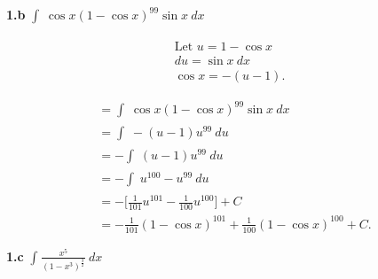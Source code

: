 \documentclass{report}
\begin{document}
    \pagebreak \bigbreak \noindent 
    \begin{mdframed}
        \textbf{1.b} $\int_{}^{}\ \cos{x}(1-\cos{x})^{99}\sin{x}\ dx $
    \end{mdframed}
    \bigbreak \noindent 
    \begin{minipage}[t]{0.47\textwidth}
    \begin{align*}
        \text{Let $u=1-\cos{x}$} \\
        du = \sin{x}\ dx \\
        \cos{x} = -(u-1)
    .\end{align*}
    \end{minipage}
    \begin{minipage}[t]{0.52\textwidth}
        \begin{align*}
            &=\int_{}^{}\ \cos{x}(1-\cos{x})^{99}\sin{x}\ dx \\
            &=\int_{}^{}\ -(u-1)u^{99}\ du \\
            &=-\int_{}^{}\ (u-1)u^{99}\ du \\
            &=-\int_{}^{}\ u^{100}-u^{99}\ du \\
            &=-\bigg[\frac{1}{101}u^{101}-\frac{1}{100}u^{100}\bigg] + C \\
            &= -\frac{1}{101}(1-\cos{x})^{101}+\frac{1}{100}(1-\cos{x})^{100} + C
        .\end{align*}
    \end{minipage}



    \pagebreak \bigbreak \noindent 
    \begin{mdframed}
       \textbf{1.c} $\int_{}^{} \frac{x^{5}}{(1-x^{3})^{\frac{3}{2}}}\ dx $
    \end{mdframed}
\end{document}
